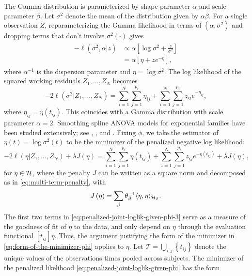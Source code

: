 The Gamma distribution is parameterized by shape parameter $\alpha$ and scale parameter $\beta$. Let $\sigma^2$ denote the mean of the distribution given by $\alpha \beta$. For a single observation $Z$, reparameterizing the Gamma likelihood in terms of $\left(\alpha, \sigma^2 \right)$ and dropping terms that don't involve $\sigma^2\left(\cdot\right)$ gives  
\begin{align}
\begin{split}
-\ell \left(\sigma^2, \alpha \vert z \right) &\propto \alpha\left[\log \sigma^2 +\frac{z}{\sigma^2} \right]  \\ 
&= \alpha\left[\eta + ze^{-\eta}\right],\label{eq:gamma-iv-likelihood-canonical-link}
\end{split}
\end{align}
\noindent
where $\alpha^{-1}$ is the dispersion parameter and $\eta = \log \sigma^2$. The log likelihood of the squared working residuals $Z_1,\dots, Z_N$ becomes 
\begin{equation} \label{eq:penalized-joint-loglik-given-phi-3}
-2\ell\left(  \sigma^2 \vert Z_1,\dots, Z_N \right) =  \sum_{i = 1}^N \sum_{j = 1}^{p_i} \eta_{ij}  + \sum_{i = 1}^N \sum_{j = 1}^{p_i} z_{ij}e^{-\eta_{ij}},
\end{equation}
\noindent
where $\eta_{ij} = \eta\left(t_{ij}\right)$. This coincides with a Gamma distribution with scale parameter $\alpha = 2$. Smoothing spline ANOVA models for exponential families have been studied extensively; see \cite{wahba1995smoothing}, \cite{wang1997grkpack}, and \cite{gu2013smoothing}. Fixing $\phi$, we take the estimator of $\eta\left(t\right) = \log\sigma^2\left(t\right)$ to be the minimizer of the penalized negative log likelihood:
\begin{equation} \label{eq:penalized-joint-loglik-given-phi}
-2\ell\left( \eta \vert Z_1,\dots, Z_N \right) +\lambda J \left(\eta\right) =  \sum_{i = 1}^N \sum_{j = 1}^{p_i} \eta\left(t_{ij}\right)  + \sum_{i = 1}^N \sum_{j = 1}^{p_i} z_{ij} e^{-\eta\left(t_{ij}\right)} + \lambda J\left(\eta\right),  
\end{equation}
\noindent
for $\eta \in \mathcal{H}$, where the penalty $J$ can be written as a square norm and decomposed as in \eqref{eq:multi-term-penalty}, with
\begin{equation*} 
J\left(\eta \right) = \sum_{\beta} \theta_\beta^{-1}\langle \eta,\eta \rangle_{\mathcal{H}_\beta}.
\end{equation*}
\noindent 
The first two terms in \eqref{eq:penalized-joint-loglik-given-phi-3} serve as a measure of the goodness of fit of $\eta$ to the data, and only depend on $\eta$ through the evaluation functional $\left[t_{ij}\right]\eta$. Thus, the argument justifying the form of the minimizer in \eqref{eq:form-of-the-minimizer-phi} applies to $\eta$. Let $\mathcal{T} = \bigcup_{i,j} \left\{t_{ij}\right\}$ denote the unique values of the observations times pooled across subjects. The minimizer of the penalized likelihood \eqref{eq:penalized-joint-loglik-given-phi} has the form 
